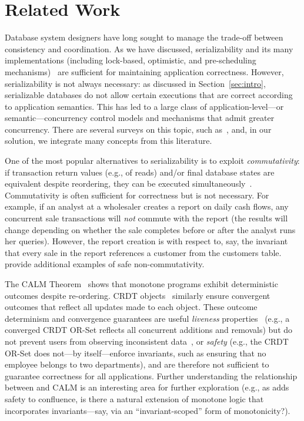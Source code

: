 
\section{Related Work}
\label{sec:relatedwork}

Database system designers have long sought to manage the trade-off
between consistency and coordination. As we have discussed,
serializability and its many implementations (including lock-based,
optimistic, and pre-scheduling
mechanisms)~\cite{silo,bernstein-book,tamer-book,hstore,gray-virtues,calvin,eswaran-consistency,sdd1}
are sufficient for maintaining application correctness. However,
serializability is not always necessary: as discussed in
Section~\ref{sec:intro}, serializable databases do not allow certain
executions that are correct according to application semantics.  This
has led to a large class of application-level---or
semantic---concurrency control models and mechanisms that admit greater
concurrency. There are several surveys on this topic, such
as~\cite{tamer-book,ic-survey}, and, in our solution, we integrate
many concepts from this literature.

 One of the most popular alternatives to
serializability is to exploit \textit{commutativity}: if transaction
return values (e.g., of reads) and/or final database states are
equivalent despite reordering, they can be executed
simultaneously~\cite{weihl-thesis,kohler-commutativity,redblue}. Commutativity
is often sufficient for correctness but is not necessary. For example,
if an analyst at a wholesaler creates a report on daily cash flows,
any concurrent sale transactions will \textit{not} commute with the
report (the results will change depending on whether the sale completes
before or after the analyst runs her queries). However, the report
creation is \iconfluent with respect to, say, the invariant that every
sale in the report references a customer from the customers
table. \cite{kohler-commutativity,lamport-audit} provide additional
examples of safe non-commutativity.

 The CALM
Theorem~\cite{ameloot-calm} shows that monotone programs exhibit
deterministic outcomes despite re-ordering. CRDT objects~\cite{crdt}
similarly ensure convergent outcomes that reflect all updates made to
each object. These outcome determinism and convergence guarantees are
useful \textit{liveness} properties~\cite{schneider-concurrent} (e.g.,
a converged CRDT OR-Set reflects all concurrent additions and
removals) but do not prevent users from observing inconsistent
data~\cite{redblue-new}, or \textit{safety} (e.g., the CRDT OR-Set
does not---by itself---enforce invariants, such as ensuring that no
employee belongs to two departments), and are therefore not sufficient
to guarantee correctness for all applications. Further understanding
the relationship between \iconfluence and CALM is an interesting area
for further exploration (e.g., as \iconfluence adds safety to
confluence, is there a natural extension of monotone logic that
incorporates \iconfluent invariants---say, via an ``invariant-scoped''
form of monotonicity?).

